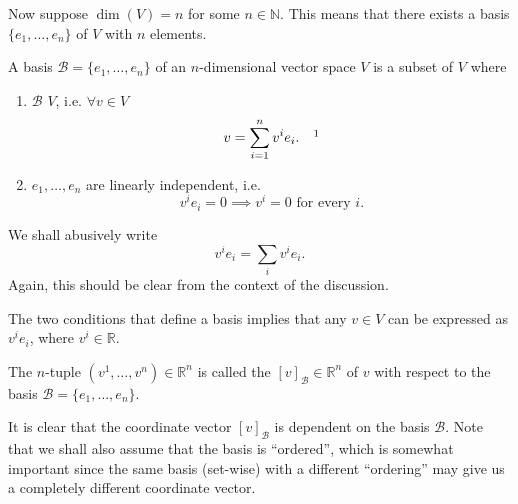 \documentclass[notoc,notitlepage]{tufte-book}
\begin{document}
Now suppose $\dim(V) = n$ for some $n \in \mathbb{N}$. This means that there exists a basis $\{ e_1 , \ldots, e_n \}$ of $V$ with $n$ elements.

\begin{defn}[Basis]\label{defn:basis}
  A basis $\mathcal{B} = \{ e_1, \ldots, e_n \}$ of an $n$-dimensional vector space $V$ is a subset of $V$ where
  \begin{enumerate}
    \item $\mathcal{B}$  $V$, i.e. $\forall v \in V$
      \begin{equation*}
        v = \sum_{i=1}^{n} v^i e_i. \quad \footnotemark
      \end{equation*}
    \item $e_1, \ldots, e_n$ are linearly independent, i.e.
      \begin{equation*}
        v^i e_i = 0 \implies v^i = 0 \text{ for every } i.
      \end{equation*}
  \end{enumerate}
\end{defn}

\begin{note}
  We shall abusively write
  \begin{equation*}
    v^i e_i = \sum_{i} v^i e_i.
  \end{equation*}
  Again, this should be clear from the context of the discussion.
\end{note}

The two conditions that define a basis implies that any $v \in V$ can be expressed as $v^i e_i$, where $v^i \in \mathbb{R}$.

\begin{defn}\label{defn:coordinate_vector}
  The $n$-tuple $(v^1, \ldots, v^n) \in \mathbb{R}^n$ is called the  $[v]_{\mathcal{B}} \in \mathbb{R}^n$ of $v$ with respect to the basis $\mathcal{B} = \{ e_1, \ldots, e_n \}$.
\end{defn}

\begin{note}
  It is clear that the coordinate vector $[v]_{\mathcal{B}}$ is dependent on the basis $\mathcal{B}$. Note that we shall also assume that the basis is ``ordered'', which is somewhat important since the same basis (set-wise) with a different ``ordering'' may give us a completely different coordinate vector.
\end{note}
\end{document}
